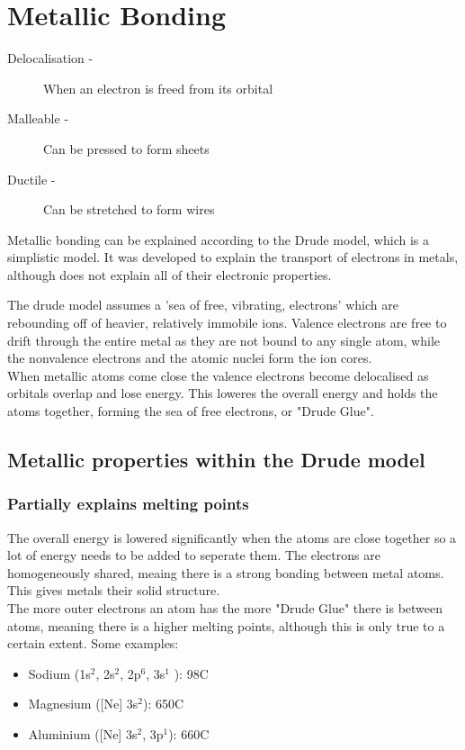 \documentclass[a4paper, 12pt]{article}
\begin{document}
	\section{Metallic Bonding}
	
		\begin{description}
			\item[Delocalisation - ] When an electron is freed from its orbital
			\item[Malleable - ] Can be pressed to form sheets
			\item[Ductile - ] Can be stretched to form wires
		\end{description}
		
		Metallic bonding can be explained according to the Drude model, which is a simplistic model. It was developed to explain the transport of electrons in metals, although does not explain all of their electronic properties. \\
		\par
		The drude model assumes a 'sea of free, vibrating, electrons' which are rebounding off of heavier, relatively immobile ions. Valence electrons are free to drift through the entire metal as they are not bound to any single atom, while the nonvalence electrons and the atomic nuclei form the ion cores. \\
		When metallic atoms come close the valence electrons become delocalised as orbitals overlap and lose energy. This loweres the overall energy and holds the atoms together, forming the sea of free electrons, or "Drude Glue". 
		
		\subsection{Metallic properties within the Drude model}
			\subsubsection*{Partially explains melting points}
				The overall energy is lowered significantly when the atoms are close together so a lot of energy needs to be added to seperate them. The electrons are homogeneously shared, meaing there is a strong bonding between metal atoms. This gives metals their solid structure. \\
				The more outer electrons an atom has the more "Drude Glue" there is between atoms, meaning there is a higher melting points, although this is only true to a certain extent. Some examples:
				\begin{itemize}
					\item Sodium (1s$^2$, 2s$^2$, 2p$^6$, 3s$^1$ ): 98\degree C 
					\item Magnesium ([Ne] 3s$^2$): 650\degree C
					\item Aluminium ([Ne] 3s$^2$, 3p$^1$): 660\degree C
				\end{itemize}
				
\end{document}

